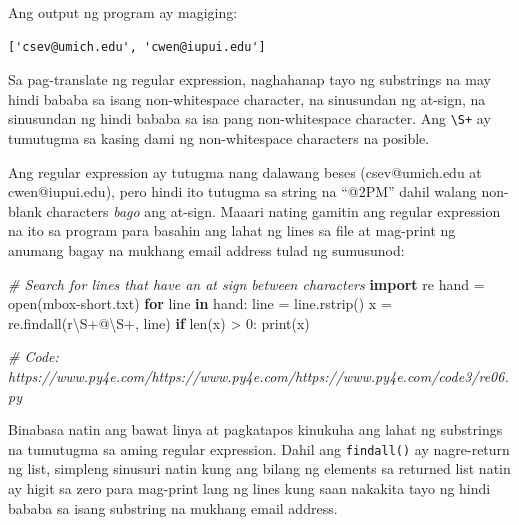 \documentclass[10pt,]{book}
\newenvironment{Shaded}{}{}
\newcommand{\BuiltInTok}[1]{\textcolor[rgb]{0.00,0.50,0.00}{#1}}
\newcommand{\CommentTok}[1]{\textcolor[rgb]{0.38,0.63,0.69}{\textit{#1}}}
\newcommand{\ControlFlowTok}[1]{\textcolor[rgb]{0.00,0.44,0.13}{\textbf{#1}}}
\newcommand{\DecValTok}[1]{\textcolor[rgb]{0.25,0.63,0.44}{#1}}
\newcommand{\ImportTok}[1]{\textcolor[rgb]{0.00,0.50,0.00}{\textbf{#1}}}
\newcommand{\KeywordTok}[1]{\textcolor[rgb]{0.00,0.44,0.13}{\textbf{#1}}}
\newcommand{\NormalTok}[1]{#1}
\newcommand{\OperatorTok}[1]{\textcolor[rgb]{0.40,0.40,0.40}{#1}}
\newcommand{\StringTok}[1]{\textcolor[rgb]{0.25,0.44,0.63}{#1}}
\newcommand{\VerbatimStringTok}[1]{\textcolor[rgb]{0.25,0.44,0.63}{#1}}
\begin{document}
Ang output ng program ay magiging:

{\small
\begin{verbatim}
['csev@umich.edu', 'cwen@iupui.edu']
\end{verbatim}
}

Sa pag-translate ng regular expression, naghahanap tayo ng substrings na
may hindi bababa sa isang non-whitespace character, na sinusundan ng
at-sign, na sinusundan ng hindi bababa sa isa pang non-whitespace
character. Ang \texttt{\textbackslash{}S+} ay tumutugma sa kasing dami
ng non-whitespace characters na posible.

Ang regular expression ay tutugma nang dalawang beses (csev@umich.edu at
cwen@iupui.edu), pero hindi ito tutugma sa string na ``@2PM'' dahil
walang non-blank characters \emph{bago} ang at-sign. Maaari nating
gamitin ang regular expression na ito sa program para basahin ang lahat
ng lines sa file at mag-print ng anumang bagay na mukhang email address
tulad ng sumusunod:

\begin{Shaded}
\begin{Highlighting}[]
\CommentTok{\# Search for lines that have an at sign between characters}
\ImportTok{import}\NormalTok{ re}
\NormalTok{hand }\OperatorTok{=} \BuiltInTok{open}\NormalTok{(}\StringTok{\textquotesingle{}mbox{-}short.txt\textquotesingle{}}\NormalTok{)}
\ControlFlowTok{for}\NormalTok{ line }\KeywordTok{in}\NormalTok{ hand:}
\NormalTok{    line }\OperatorTok{=}\NormalTok{ line.rstrip()}
\NormalTok{    x }\OperatorTok{=}\NormalTok{ re.findall(}\VerbatimStringTok{r\textquotesingle{}}\DecValTok{\textbackslash{}S}\OperatorTok{+}\VerbatimStringTok{@}\DecValTok{\textbackslash{}S}\OperatorTok{+}\VerbatimStringTok{\textquotesingle{}}\NormalTok{, line)}
    \ControlFlowTok{if} \BuiltInTok{len}\NormalTok{(x) }\OperatorTok{\textgreater{}} \DecValTok{0}\NormalTok{:}
        \BuiltInTok{print}\NormalTok{(x)}

\CommentTok{\# Code: https://www.py4e.com/https://www.py4e.com/https://www.py4e.com/code3/re06.py}
\end{Highlighting}
\end{Shaded}


Binabasa natin ang bawat linya at pagkatapos kinukuha ang lahat ng
substrings na tumutugma sa aming regular expression. Dahil ang
\texttt{findall()} ay nagre-return ng list, simpleng sinusuri natin kung
ang bilang ng elements sa returned list natin ay higit sa zero para
mag-print lang ng lines kung saan nakakita tayo ng hindi bababa sa isang
substring na mukhang email address.
\end{document}
